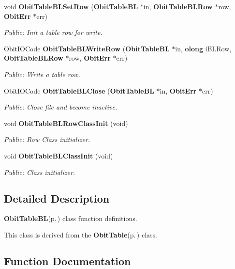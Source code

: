\begin{CompactItemize}
void {\bf Obit\-Table\-BLSet\-Row} ({\bf Obit\-Table\-BL} $\ast$in, {\bf Obit\-Table\-BLRow} $\ast$row, {\bf Obit\-Err} $\ast$err)
\begin{CompactList}\small\item\em Public: Init a table row for write. \item\end{CompactList}\item 
Obit\-IOCode {\bf Obit\-Table\-BLWrite\-Row} ({\bf Obit\-Table\-BL} $\ast$in, {\bf olong} i\-BLRow, {\bf Obit\-Table\-BLRow} $\ast$row, {\bf Obit\-Err} $\ast$err)
\begin{CompactList}\small\item\em Public: Write a table row. \item\end{CompactList}\item 
Obit\-IOCode {\bf Obit\-Table\-BLClose} ({\bf Obit\-Table\-BL} $\ast$in, {\bf Obit\-Err} $\ast$err)
\begin{CompactList}\small\item\em Public: Close file and become inactive. \item\end{CompactList}\item 
void {\bf Obit\-Table\-BLRow\-Class\-Init} (void)
\begin{CompactList}\small\item\em Public: Row Class initializer. \item\end{CompactList}\item 
void {\bf Obit\-Table\-BLClass\-Init} (void)
\begin{CompactList}\small\item\em Public: Class initializer. \item\end{CompactList}\end{CompactItemize}


\subsection{Detailed Description}
{\bf Obit\-Table\-BL}{\rm (p.\,\pageref{structObitTableBL})} class function definitions. 

This class is derived from the {\bf Obit\-Table}{\rm (p.\,\pageref{structObitTable})} class.

\subsection{Function Documentation}
